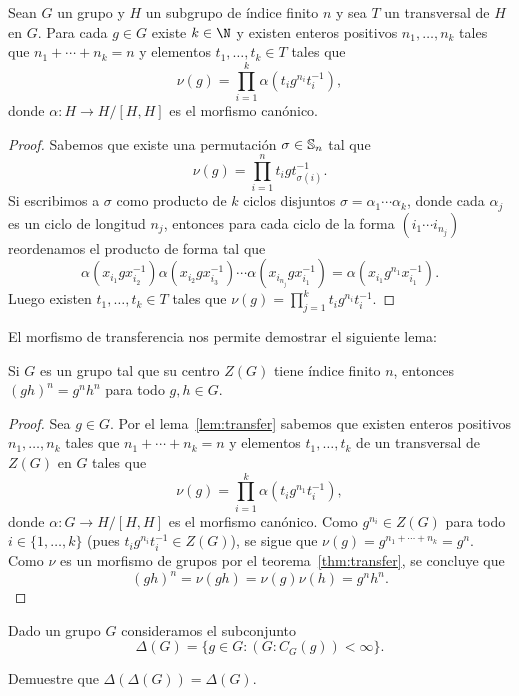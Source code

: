 \begin{lemma}
	\label{lem:transfer}
	Sean $G$ un grupo y $H$ un subgrupo de índice finito $n$ y sea $T$ un
	transversal de $H$ en $G$.  Para cada $g\in G$ existe $k\in\N$ y existen
	enteros positivos $n_1,\dots,n_k$ tales que $n_1+\cdots+n_k=n$ y elementos
	$t_1,\dots,t_k\in T$ tales que 
	\[
		\nu(g)=\prod_{i=1}^k \alpha(t_ig^{n_i}t_i^{-1}),
	\]
	donde $\alpha\colon H\to H/[H,H]$ es el morfismo canónico. 
\end{lemma}

\begin{proof}
	Sabemos que existe una permutación $\sigma\in\mathbb{S}_n$ tal que 
	\[
	\nu(g)=\prod_{i=1}^n t_igt_{\sigma(i)}^{-1}. 
	\]
	Si escribimos a $\sigma$ como producto de $k$ ciclos disjuntos
	$\sigma=\alpha_1\cdots\alpha_k$, donde cada $\alpha_j$ es un ciclo de
	longitud $n_j$,  entonces para cada ciclo de la forma $(i_1\cdots i_{n_j})$
	reordenamos el producto de forma tal que
	\[
		\alpha(x_{i_1}gx_{i_2}^{-1})\alpha(x_{i_2}gx_{i_3}^{-1})\cdots \alpha(x_{i_{n_j}}gx_{i_1}^{-1})=\alpha(x_{i_1}g^{n_1}x_{i_1}^{-1}).
	\]
	Luego existen $t_1,\dots,t_k\in T$ tales que
	$\nu(g)=\prod_{j=1}^k t_ig^{n_i}t_i^{-1}$. 
\end{proof}

El morfismo de transferencia nos permite demostrar el siguiente
lema:

\begin{lemma}
	\label{lem:center}
	Si $G$ es un grupo tal que su centro $Z(G)$ tiene índice finito $n$, entonces
	$(gh)^n=g^nh^n$ para todo $g,h\in G$.	
\end{lemma}

\begin{proof}
	Sea $g\in G$.  Por el lema~\ref{lem:transfer} sabemos que existen enteros
	positivos $n_1,\dots,n_k$ tales que $n_1+\cdots+n_k=n$ y elementos
	$t_1,\dots,t_k$ de un transversal de $Z(G)$ en $G$ tales que 
	\[
		\nu(g)=\prod_{i=1}^k \alpha(t_ig^{n_1}t_i^{-1}),
	\]
	donde $\alpha\colon G\to H/[H,H]$ es el morfismo canónico.  Como
	$g^{n_i}\in Z(G)$ para todo $i\in\{1,\dots,k\}$ (pues $t_ig^{n_i}t_i^{-1}\in Z(G)$), se sigue que
	$\nu(g)=g^{n_1+\cdots+n_k}=g^n$.  Como $\nu$ es un morfismo de
	grupos por el teorema~\ref{thm:transfer}, se concluye que
	\[
		(gh)^n=\nu(gh)=\nu(g)\nu(h)=g^nh^n. 
	\]
\end{proof}

Dado un grupo $G$ consideramos 
el subconjunto
\[
	\Delta(G)=\{g\in G:(G:C_G(g))<\infty\}.
\]

\begin{exercise}
	Demuestre que $\Delta(\Delta(G))=\Delta(G)$.
\end{exercise}

